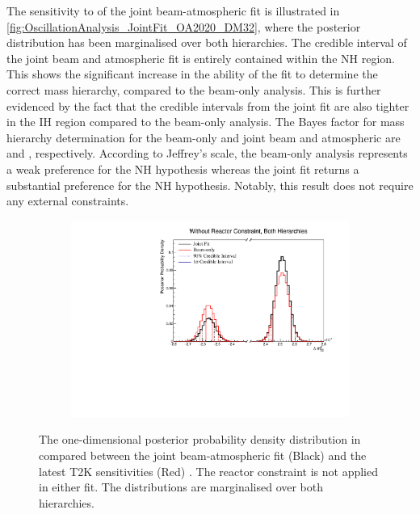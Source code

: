 The sensitivity to  of the joint beam-atmospheric fit is illustrated in \autoref{fig:OscillationAnalysis_JointFit_OA2020_DM32}, where the posterior distribution has been marginalised over both hierarchies. The \quickmath{1\sigma} credible interval of the joint beam and atmospheric fit is entirely contained within the NH region. This shows the significant increase in the ability of the fit to determine the correct mass hierarchy, compared to the beam-only analysis. This is further evidenced by the fact that the  credible intervals from the joint fit are also tighter in the IH region compared to the beam-only analysis. The Bayes factor for mass hierarchy determination for the beam-only and joint beam and atmospheric are  and , respectively. According to Jeffrey's scale, the beam-only analysis represents a weak preference for the NH hypothesis whereas the joint fit returns a substantial preference for the NH hypothesis. Notably, this result does not require any external constraints.

\begin{figure}[h]
  \begin{subfigure}[t]{0.98\textwidth}
    \includegraphics[width=\textwidth, trim={0mm 0mm 0mm 0mm}, clip,page=1]{Figures/OA/JointFit_OA2020_Comp/ContourComparison_1D_dm32_BH_2_woRC_UnSmeared_CredibleInterval.pdf}
  \end{subfigure}
  \caption{The one-dimensional posterior probability density distribution in  compared between the joint beam-atmospheric fit (Black) and the latest T2K sensitivities (Red) \cite{Dunne2020-uf, t2k_tn_393}. The reactor constraint is not applied in either fit. The distributions are marginalised over both hierarchies.}
  \label{fig:OscillationAnalysis_JointFit_OA2020_DM32}
\end{figure}

